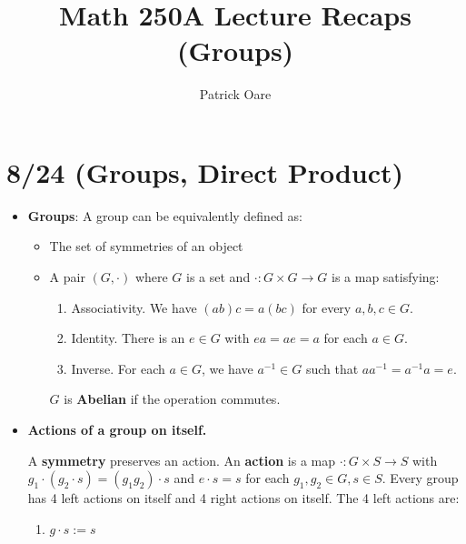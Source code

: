 \documentclass[11pt, oneside]{amsart}   	%
\title{Math 250A Lecture Recaps (Groups)}
\author{Patrick Oare}
\theoremstyle{definition}
\begin{document}
\maketitle
\section{8/24 (Groups, Direct Product)}

\begin{itemize}

	\item \textbf{Groups}: A group can be equivalently defined as:
		
		\begin{itemize}
			
			\item The set of symmetries of an object
			
			\item A pair $(G, \cdot)$ where $G$ is a set and $\cdot : G\times G\rightarrow G$ is a map satisfying:
			
				\begin{enumerate}
					
					\item Associativity. We have $(ab)c = a(bc)$ for every $a, b, c\in G$.
					
					\item Identity. There is an $e\in G$ with $ea = ae = a$ for each $a\in G$.
					
					\item Inverse. For each $a\in G$, we have $a^{-1}\in G$ such that $aa^{-1} = a^{-1}a = e$.
					
				\end{enumerate}
				
				$G$ is \textbf{Abelian} if the operation commutes.
			
		\end{itemize}
		
	\item \textbf{Actions of a group on itself.}
	
	A \textbf{symmetry} preserves an action. An \textbf{action} is a map $\cdot: G\times S\rightarrow S$ with $g_1\cdot(g_2\cdot s) = (g_1g_2)\cdot 
	s$ and $e\cdot s = s$ for each $g_1, g_2\in G, s\in S$. Every group has 4 left actions on itself and 4 right actions on itself. The 4 left actions 
	are:
	
		\begin{enumerate}
		
			\item $g\cdot s := s$
			

\end{enumerate}
\end{itemize}
\end{document}
